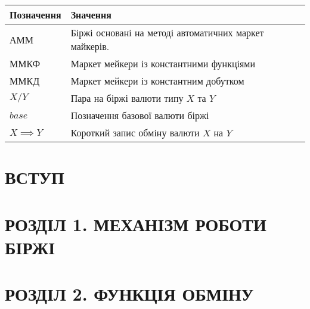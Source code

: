 \documentclass[14pt]{extarticle}
\begin{document}
\begin{center}
	\begin{tabular}{ll}
		Позначення       & Значення                                               \\[0pt]
		\hline{}
		АММ              & Біржі основані на методі автоматичних маркет майкерів. \\[0pt]
		ММКФ             & Маркет мейкери із константними функціями               \\[0pt]
		ММКД             & Маркет мейкери із константним добутком                 \\[0pt]
		\(X/Y\)          & Пара на біржі валюти типу \(X\) та \(Y\)               \\[0pt]
		$base$           & Позначення базової валюти біржі                        \\[0pt]
		\(X \implies Y\) & Короткий запис обміну валюти \(X\) на \(Y\)            \\[0pt]
	\end{tabular}
\end{center}

\newpage

\titleformat{\section}[block]{\Large\bfseries\filcenter}{}{1em}{}
\section*{ВСТУП}\label{sec:intro}


\newpage

\setcounter{section}{0}
\titleformat{\section}[block]{\Large\bfseries\filcenter}{}{1em}{}

\section*{РОЗДІЛ 1. МЕХАНІЗМ РОБОТИ БІРЖІ}\label{sec:order-book-cmp}
\setcounter{section}{1}

\newpage

\section*{РОЗДІЛ 2. ФУНКЦІЯ ОБМІНУ}\label{sec:swap-function}
\setcounter{section}{2}

\newpage
\end{document}
